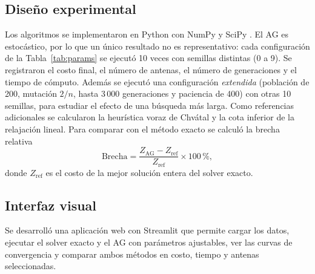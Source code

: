 \subsection{Diseño experimental}
Los algoritmos se implementaron en Python con NumPy y SciPy \cite{scipy20}. El AG es estocástico, por lo que un único resultado no es representativo: cada configuración de la Tabla~\ref{tab:params} se ejecutó 10 veces con semillas distintas (0 a 9). Se registraron el costo final, el número de antenas, el número de generaciones y el tiempo de cómputo. Además se ejecutó una configuración \textit{extendida} (población de 200, mutación $2/n$, hasta 3\,000 generaciones y paciencia de 400) con otras 10 semillas, para estudiar el efecto de una búsqueda más larga. Como referencias adicionales se calcularon la heurística voraz de Chv\'atal y la cota inferior de la relajación lineal. Para comparar con el método exacto se calculó la brecha relativa
\[
\text{Brecha}=\frac{Z_{\text{AG}}-Z_{\text{ref}}}{Z_{\text{ref}}}\times 100\,\%,
\]
donde $Z_{\text{ref}}$ es el costo de la mejor solución entera del solver exacto.

\subsection{Interfaz visual}
Se desarrolló una aplicación web con Streamlit que permite cargar los datos, ejecutar el solver exacto y el AG con parámetros ajustables, ver las curvas de convergencia y comparar ambos métodos en costo, tiempo y antenas seleccionadas.
